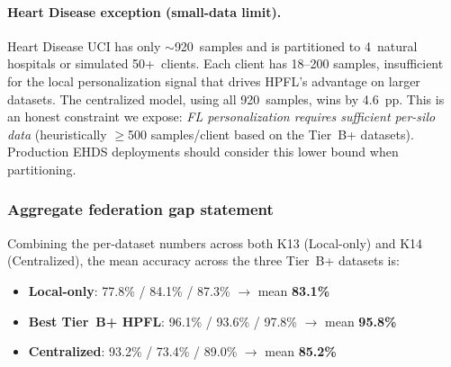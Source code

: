 \documentclass[conference]{IEEEtran}
\begin{document}
\begin{table}[htbp]
\centering
\caption{Centralized vs.\ Best Tier~B+ HPFL across 5~datasets. FL HPFL wins 3/5, Centralized wins 1/5 (Heart Disease, small-data limit), and 1/5 is tied.}
\label{tab:tier_b_central_vs_fl}
\small
\setlength{\tabcolsep}{5pt}
\end{table}

\paragraph{Heart Disease exception (small-data limit).} Heart Disease UCI has only $\sim$920~samples and is partitioned to 4~natural hospitals or simulated 50+~clients. Each client has 18--200 samples, insufficient for the local personalization signal that drives HPFL's advantage on larger datasets. The centralized model, using all 920~samples, wins by 4.6~pp. This is an honest constraint we expose: \emph{FL personalization requires sufficient per-silo data} (heuristically $\geq$500 samples/client based on the Tier~B+ datasets). Production EHDS deployments should consider this lower bound when partitioning.

\subsubsection*{Aggregate federation gap statement}

Combining the per-dataset numbers across both K13 (Local-only) and K14 (Centralized), the mean accuracy across the three Tier~B+ datasets is:

\begin{itemize}
\item \textbf{Local-only}: 77.8\% / 84.1\% / 87.3\% $\to$ mean \textbf{83.1\%}
\item \textbf{Best Tier~B+ HPFL}: 96.1\% / 93.6\% / 97.8\% $\to$ mean \textbf{95.8\%}
\item \textbf{Centralized}: 93.2\% / 73.4\% / 89.0\% $\to$ mean \textbf{85.2\%}
\end{itemize}
\end{document}
